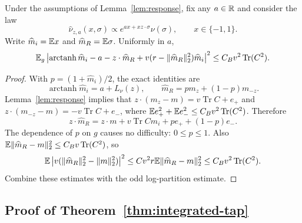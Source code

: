 \documentclass[11pt,reqno]{amsart}
\newcommand{\Tr}{\operatorname{Tr}}
\newcommand{\atanh}{\operatorname{arctanh}}
\begin{document}
\begin{lem}\label{lem:row-residual}
Under the assumptions of Lemma~\ref{lem:response}, fix any $a\in{\mathbb{R}}$ and
consider the law
\[
 \widehat\nu_{z,a}(x,\sigma)\propto
 e^{ax+xz\cdot\sigma}\nu(\sigma),\qquad x\in\{-1,1\}.
\]
Write $\widehat m_i={\mathbb{E}} x$ and $\widehat m_R={\mathbb{E}}\sigma$. Uniformly in $a$,
\[
 \bbE_g\left|
 \atanh\widehat m_i-a-z\cdot\widehat m_R
       +v(r-\|\widehat m_R\|_2^2)\widehat m_i
 \right|^2\le C_Bv^2\Tr(C^2).
\]
\end{lem}

\begin{proof}
With $p=(1+\widehat m_i)/2$, the exact identities are
\[
 \atanh\widehat m_i=a+L_\nu(z),\qquad
 \widehat m_R=p m_z+(1-p)m_{-z}.
\]
Lemma~\ref{lem:response} implies that
$z\cdot(m_z-m)=v\Tr C+e_+$ and
$z\cdot(m_{-z}-m)=-v\Tr C+e_-$, where
$\bbE e_+^2+\bbE e_-^2\le C_Bv^2\Tr(C^2)$.
Therefore
\[
 z\cdot\widehat m_R=z\cdot m+v\Tr C\widehat m_i
                          +p e_++(1-p)e_-.
\]
The dependence of $p$ on $g$ causes no difficulty: $0\le p\le1$.
Also $\bbE\|\widehat m_R-m\|_2^2\le C_Bv\Tr(C^2)$, so
\[
 \bbE\left|v(\|\widehat m_R\|_2^2-\|m\|_2^2)\right|^2
 \le C v^2r\bbE\|\widehat m_R-m\|_2^2
 \le C_Bv^2\Tr(C^2).
\]
Combine these estimates with the odd log-partition estimate.
\end{proof}


\subsection{Proof of Theorem~\ref{thm:integrated-tap}}
\end{document}

